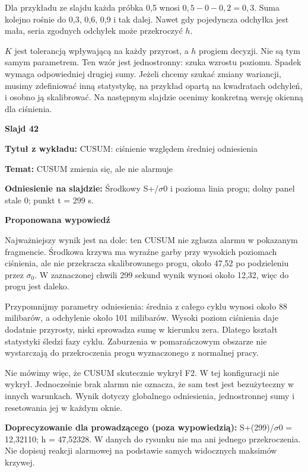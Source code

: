 \documentclass[a4paper,11pt]{article}
\newcommand{\NumerSlajdu}{1}
\newcommand{\Komentarz}[3]{%
  \gdef\NumerSlajdu{#1}%
  {\Large\bfseries Slajd #1\par}\smallskip
  \textbf{Tytuł z wykładu:} #2\par
  \textbf{Temat:} #3\par\medskip
}
\begin{document}
Dla przykładu ze slajdu każda próbka 0,5 wnosi $0{,}5-0-0{,}2=0{,}3$. Suma kolejno rośnie do 0,3, 0,6, 0,9 i tak dalej. Nawet gdy pojedyncza odchyłka jest mała, seria zgodnych odchyłek może przekroczyć $h$.

$K$ jest tolerancją wpływającą na każdy przyrost, a $h$ progiem decyzji. Nie są tym samym parametrem. Ten wzór jest jednostronny: szuka wzrostu poziomu. Spadek wymaga odpowiedniej drugiej sumy. Jeżeli chcemy szukać zmiany wariancji, musimy zdefiniować inną statystykę, na przykład opartą na kwadratach odchyleń, i osobno ją skalibrować. Na następnym slajdzie ocenimy konkretną wersję okienną dla ciśnienia.
\clearpage

\Komentarz{42}{CUSUM: ciśnienie względem średniej odniesienia}{CUSUM zmienia się, ale nie alarmuje}
{\small\color{black!65}\textbf{Odniesienie na slajdzie:} Środkowy S+/\ensuremath{\sigma}0 i pozioma linia progu; dolny panel stale 0; punkt t = 299 s.\par}
\medskip
\textbf{Proponowana wypowiedź}\par
Najważniejszy wynik jest na dole: ten CUSUM nie zgłasza alarmu w pokazanym fragmencie. Środkowa krzywa ma wyraźne garby przy wysokich poziomach ciśnienia, ale nie przekracza skalibrowanego progu, około 47,52 po podzieleniu przez $\sigma_0$. W zaznaczonej chwili 299 sekund wynik wynosi około 12,32, więc do progu jest daleko.

Przypomnijmy parametry odniesienia: średnia z całego cyklu wynosi około 88 milibarów, a odchylenie około 101 milibarów. Wysoki poziom ciśnienia daje dodatnie przyrosty, niski sprowadza sumę w kierunku zera. Dlatego kształt statystyki śledzi fazy cyklu. Zaburzenia w pomarańczowym obszarze nie wystarczają do przekroczenia progu wyznaczonego z normalnej pracy.

Nie mówimy więc, że CUSUM skutecznie wykrył F2. W tej konfiguracji nie wykrył. Jednocześnie brak alarmu nie oznacza, że sam test jest bezużyteczny w innych warunkach. Wynik dotyczy globalnego odniesienia, jednostronnej sumy i resetowania jej w każdym oknie.

{\small\color{black!65}\textbf{Doprecyzowanie dla prowadzącego (poza wypowiedzią):} S+(299)/\ensuremath{\sigma}0 = 12,32110; h = 47,52328. W danych do rysunku nie ma ani jednego przekroczenia. Nie dopisuj reakcji alarmowej na podstawie samych widocznych maksimów krzywej.\par}
\clearpage
\end{document}
